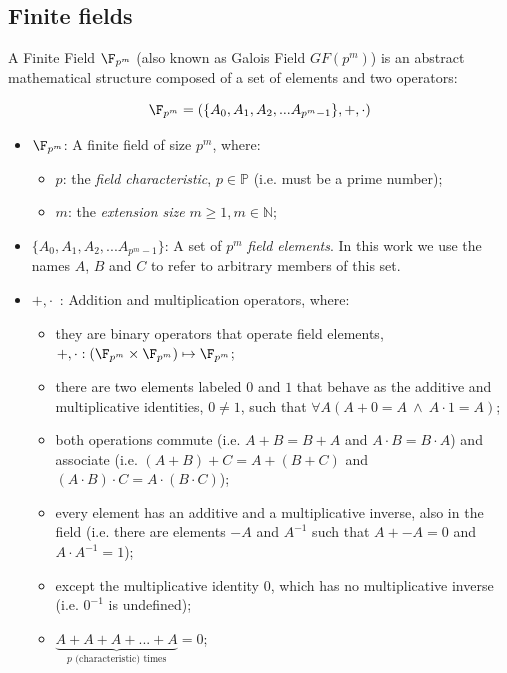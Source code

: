 \subsection{Finite fields}

A Finite Field $\F_{p^m}$ (also known as Galois Field $GF(p^m)$) is an abstract mathematical structure composed of a set of elements and two operators:

\[
\F_{p^m} = (\{A_0, A_1, A_2, ... A_{p^m-1}\}, +, \cdot)
\]

\begin{itemize}
\item $\F_{p^m}$: A finite field of size $p^m$, where:
    \begin{itemize}
    \item $p$: the \emph{field characteristic}, $p \in \mathbb{P}$ (i.e. must be a prime number);
    \item $m$: the \emph{extension size} $m \geq 1, m \in \mathbb{N}$;
    \end{itemize}
\item $\{A_0, A_1, A_2, ... A_{p^m-1}\}$: A set of $p^m$ \emph{field elements}. In this work we use the names $A$, $B$ and $C$ to refer to arbitrary members of this set.
\item $+, \cdot$~: Addition and multiplication operators, where:
    \begin{itemize}
    \item they are binary operators that operate field elements, $+, \cdot : (\F_{p^m} \times \F_{p^m}) \mapsto \F_{p^m}$;
    \item there are two elements labeled $0$ and $1$ that behave as the additive and multiplicative identities, $0 \neq 1$, such that $\forall A (A + 0 = A~\wedge~A \cdot 1 = A)$;
    \item both operations commute (i.e. $A + B = B + A$ and $A \cdot B = B \cdot A$) and associate (i.e. $(A + B) + C = A + (B + C)$ and $(A \cdot B) \cdot C = A \cdot (B \cdot C)$);
    \item every element has an additive and a multiplicative inverse, also in the field (i.e. there are elements $-A$ and $A^{-1}$ such that $A + -A = 0$ and $A \cdot A^{-1} = 1$);
    \item except the multiplicative identity $0$, which has no multiplicative inverse (i.e. $0^{-1}$ is undefined);
    \item $\underbrace{A + A + A + ... + A}_{\text{$p$ (characteristic) times}} = 0$;
    \end{itemize}
\end{itemize}

